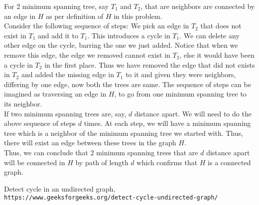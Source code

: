 \documentclass[11pt]{article}
\begin{document}
For 2 minimum spanning tree, say $ T_1 $ and $ T_2 $, that are neighbors are connected by an edge in $ H $ as per definition of $ H $ in this problem. \\

Consider the following sequence of steps: We pick an edge in $ T_2 $ that does not exist in $ T_1 $ and add it to $ T_1 $. This introduces a cycle in $ T_1 $. We can delete any other edge on the cycle, barring the one we just added. Notice that when we remove this edge, the edge we removed cannot exist in $ T_2 $, else it would have been a cycle in $ T_2 $ in the first place. Thus we have removed the edge that did not exists in $ T_2 $ and added the missing edge in $ T_1 $ to it and given they were neighbors, differing by one edge, now both the trees are same. The sequence of steps can be imagined as traversing an edge in $ H $, to go from one minimum spanning tree to its neighbor. \\

If two minimum spanning trees are, say, $ d $ distance apart. We will need to do the above sequence of steps $ d $ times. At each step, we will have a minimum spanning tree which is a neighbor of the minimum spanning tree we started with. Thus, there will exist an edge between these trees in the graph $ H $. \\

Thus, we can conclude that 2 minimum spanning trees that are $ d $ distance apart will be connected in $ H $ by path of length $ d $ which confirms that $ H $ is a connected graph.

\clearpage

\begin{thebibliography}{9}
	Detect cycle in an undirected graph,
	\\\texttt{https://www.geeksforgeeks.org/detect-cycle-undirected-graph/}
	
\end{thebibliography}
\end{document}
